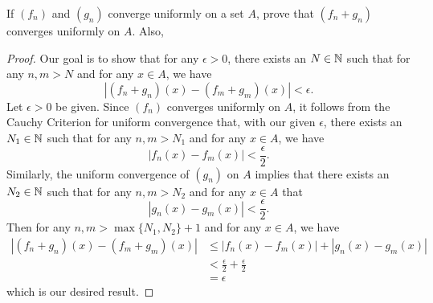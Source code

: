 \documentclass[a4paper]{article}
\begin{document}
\begin{problem}
   If \( ({f}_{n}) \) and \( ({g}_{n}) \) converge uniformly on a set \( A  \), prove that \( ({f}_{n} + {g}_{n})  \) converges uniformly on \( A  \). Also,
\end{problem}
\begin{proof}
Our goal is to show that for any \( \epsilon > 0  \), there exists an \( N \in \mathbb{N} \) such that for any \( n,m > N  \) and for any \( x \in A  \), we have 
\[  | ({f}_{n} + {g}_{n})(x) - ({f}_{m} + {g}_{m})(x) | < \epsilon. \]
Let \( \epsilon > 0  \) be given. Since \( ({f}_{n}) \) converges uniformly on \( A  \), it follows from the Cauchy Criterion for uniform convergence that, with our given \( \epsilon  \), there exists an \( {N}_{1} \in \mathbb{N} \) such that for any \( n,m > {N}_{1} \) and for any \( x \in A  \), we have 
\[ | {f}_{n}(x) - {f}_{m}(x) | < \frac{ \epsilon }{ 2 }. \tag{1}  \]
Similarly, the uniform convergence of \( ({g}_{n}) \) on \( A  \) implies that there exists an \( {N}_{2} \in \mathbb{N} \) such that for any \( n,m > {N}_{2} \) and for any \( x \in A  \) that 
\[  | {g}_{n}(x) - {g}_{m}(x) | < \frac{ \epsilon }{ 2 }. \tag{2} \]
Then for any \( n,m > \max \{ {N}_{1}, {N}_{2} \}  + 1  \) and for any \( x \in A \), we have
\begin{align*}
    | ({f}_{n} + {g}_{n})(x) - ({f}_{m} + {g}_{m})(x) | &\leq | {f}_{n}(x) - {f}_{m}(x)  | + | {g}_{n}(x) - {g}_{m}(x) |   \\
                                                        &< \frac{ \epsilon }{ 2 }  + \frac{ \epsilon }{ 2 }  \\
                                                        &= \epsilon
\end{align*}
which is our desired result.
\end{proof}
\end{document}
